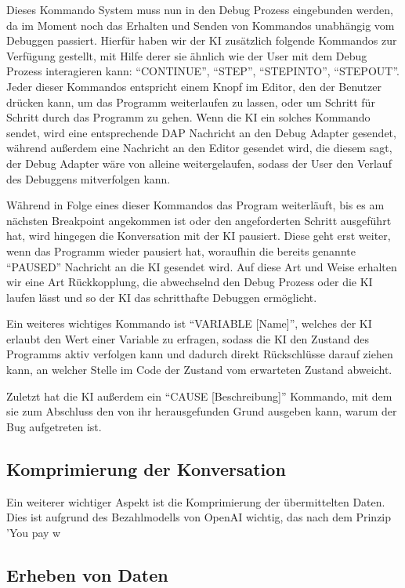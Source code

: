 \documentclass[a4paper,12pt,ngerman]{scrartcl}
\begin{document}
Dieses Kommando System muss nun in den Debug Prozess eingebunden werden, da im Moment noch das Erhalten und Senden von Kommandos unabhängig vom Debuggen passiert. Hierfür haben wir der KI zusätzlich folgende Kommandos zur Verfügung gestellt, mit Hilfe derer sie ähnlich wie der User mit dem Debug Prozess interagieren kann: ``CONTINUE'', ``STEP'', ``STEPINTO'', ``STEPOUT''. Jeder dieser Kommandos entspricht einem Knopf im Editor, den der Benutzer drücken kann, um das Programm weiterlaufen zu lassen, oder um Schritt für Schritt durch das Programm zu gehen. Wenn die KI ein solches Kommando sendet, wird eine entsprechende DAP Nachricht an den Debug Adapter gesendet, während außerdem eine Nachricht an den Editor gesendet wird, die diesem sagt, der Debug Adapter wäre von alleine weitergelaufen, sodass der User den Verlauf des Debuggens mitverfolgen kann.

Während in Folge eines dieser Kommandos das Program weiterläuft, bis es am nächsten Breakpoint angekommen ist oder den angeforderten Schritt ausgeführt hat, wird hingegen die Konversation mit der KI pausiert. Diese geht erst weiter, wenn das Programm wieder pausiert hat, woraufhin die bereits genannte ``PAUSED'' Nachricht an die KI gesendet wird. Auf diese Art und Weise erhalten wir eine Art Rückkopplung, die abwechselnd den Debug Prozess oder die KI laufen lässt und so der KI das schritthafte Debuggen ermöglicht.

Ein weiteres wichtiges Kommando ist ``VARIABLE [Name]'', welches der KI erlaubt den Wert einer Variable zu erfragen, sodass die KI den Zustand des Programms aktiv verfolgen kann und dadurch direkt Rückschlüsse darauf ziehen kann, an welcher Stelle im Code der Zustand vom erwarteten Zustand abweicht.

Zuletzt hat die KI außerdem ein ``CAUSE [Beschreibung]'' Kommando, mit dem sie zum Abschluss den von ihr herausgefunden Grund ausgeben kann, warum der Bug aufgetreten ist.

\subsection{Komprimierung der Konversation}

Ein weiterer wichtiger Aspekt ist die Komprimierung der übermittelten Daten. Dies ist aufgrund des Bezahlmodells von OpenAI wichtig, das nach dem Prinzip 'You pay w

\subsection{Erheben von Daten}
\end{document}
